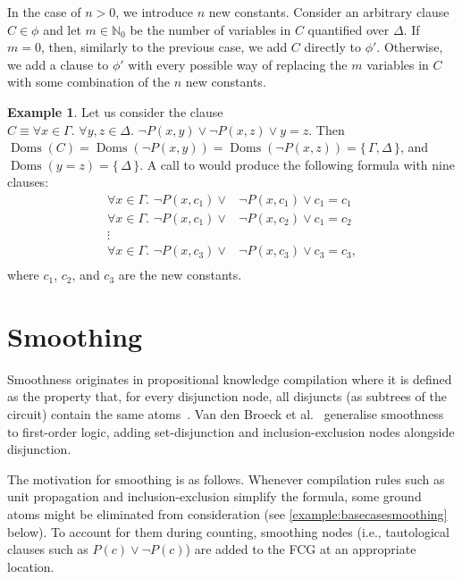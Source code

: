 \documentclass{article}
\theoremstyle{definition}
\newtheorem{example}{Example}
\DeclareMathOperator{\Doms}{Doms}
\begin{document}
In the case of $n>0$, we introduce $n$ new constants. Consider an arbitrary
clause $C \in \phi$ and let $m \in \mathbb{N}_{0}$ be the number of variables in
$C$ quantified over $\Delta$. If $m=0$, then, similarly to the previous case, we
add $C$ directly to $\phi'$. Otherwise, we add a clause to $\phi'$ with every
possible way of replacing the $m$ variables in $C$ with some combination of the
$n$ new constants.

\begin{example}
  Let us consider the clause $C \equiv \forall x \in \Gamma\text{.
  }\forall y, z \in \Delta\text{. } \neg P(x, y) \lor \neg P(x, z) \lor y=z$.
  Then
  $\Doms(C) = \Doms(\neg P(x, y)) = \Doms(\neg P(x, z)) = \{\, \Gamma, \Delta \,\}$,
  and $\Doms(y=z) = \{\, \Delta \,\}$. A call to  would produce the following formula with nine clauses:
  \begin{align*}
    \forall x \in \Gamma\text{. }\neg P(x, c_{1}) \lor& \neg P(x, c_{1}) \lor c_{1}=c_{1}\\
    \forall x \in \Gamma\text{. }\neg P(x, c_{1}) \lor& \neg P(x, c_{2}) \lor c_{1}=c_{2}\\
    \vdots&\\
    \forall x \in \Gamma\text{. }\neg P(x, c_{3}) \lor& \neg P(x, c_{3}) \lor c_{3}=c_{3},\\
  \end{align*}
  where $c_{1}$, $c_{2}$, and $c_{3}$ are the new constants.
\end{example}

\section{Smoothing}

Smoothness originates in propositional knowledge compilation where it is defined
as the property that, for every disjunction node, all disjuncts (as subtrees of
the circuit) contain the same atoms~\cite{darwiche2001tractable}. Van den Broeck
et al.~ generalise smoothness to
first-order logic, adding set-disjunction and inclusion-exclusion nodes
alongside disjunction.

The motivation for smoothing is as follows. Whenever compilation rules such as
unit propagation and inclusion-exclusion simplify the formula, some ground atoms
might be eliminated from consideration (see \cref{example:basecasesmoothing}
below). To account for them during counting, smoothing nodes (i.e., tautological
clauses such as $P(c) \lor \neg P(c)$) are added to the FCG at an appropriate
location.
\end{document}
